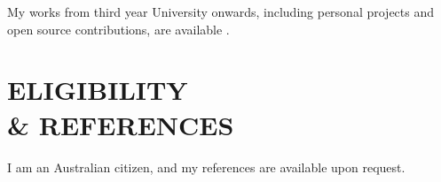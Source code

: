 \documentclass[margin, 11pt]{res} %
\begin{document}
\begin{resume}
My works from third year University onwards, including personal projects and open source contributions, are available \underline{}.





\section{ELIGIBILITY \\ \& REFERENCES} 

I am an Australian citizen, and my references are available upon request.

\end{resume}
\end{document}
